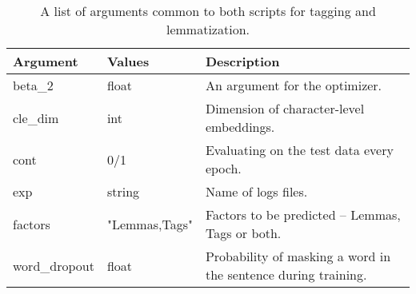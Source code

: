 \begin{table}
\centering
\begin{tabular}{ |p{3cm}|p{}|p{6cm}| } 
 \hline
 Argument & Values & Description \\ 
 \hline \hline
 beta\_2 & float & An argument for the optimizer. \\ \hline
 cle\_dim & int & Dimension of character-level embeddings.  \\ \hline
 cont & 0/1 & Evaluating on the test data every epoch.  \\ \hline
 exp & string & Name of logs files.  \\ \hline
 factors & "Lemmas,Tags" & Factors to be predicted -- Lemmas, Tags or both. \\ \hline
word\_dropout & float & Probability of masking a word in the sentence during training.  \\ \hline

\hline

\end{tabular}
\caption{A list of arguments common to both scripts for tagging and lemmatization.} 
\label{Tab:mt_com_args}
\end{table}


